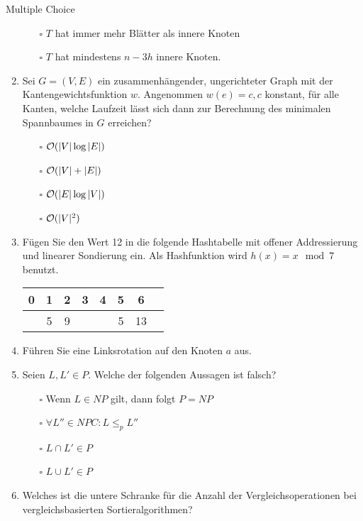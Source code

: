 \documentclass{article}
\begin{document}
\begin{exercise}{Multiple Choice}
\begin{enumerate}
\begin{itemize}
            \item[$\square$] $T$ hat immer mehr Blätter als innere Knoten
            \item[$\square$] $T$ hat mindestens $n - 3h$ innere Knoten.
          \end{itemize}
    \item Sei $G = (V,E)$ ein zusammenhängender, ungerichteter Graph mit der Kantengewichtsfunktion $w$. Angenommen $w(e) = c, c$ konstant, für alle Kanten, welche Laufzeit lässt sich dann zur Berechnung des minimalen Spannbaumes in $G$ erreichen?
          \begin{itemize}
            \item[$\square$] $\mathcal{O}(|V| \log |E|)$
            \item[$\square$] $\mathcal{O}(|V| + |E|)$
            \item[$\square$] $\mathcal{O}(|E| \log |V|)$
            \item[$\square$] $\mathcal{O}(|V|^2)$
          \end{itemize}
    \item Fügen Sie den Wert 12 in die folgende Hashtabelle mit offener Addressierung und linearer Sondierung ein. Als Hashfunktion wird $h(x) = x \mod 7$ benutzt.
          \begin{center}
            \begin{tabular}{|c|c|c|c|c|c|c|c|}
              \hline
              0 & 1 & 2 & 3 & 4 & 5 & 6  \\
              \hline
              \hline
                & 5 & 9 &   &   & 5 & 13 \\
              \hline
            \end{tabular}
          \end{center}
    \item Führen Sie eine Linksrotation auf den Knoten $a$ aus.
    \item Seien $L, L' \in P$. Welche der folgenden Aussagen ist falsch?
          \begin{itemize}
            \item[$\square$] Wenn $L \in NP$ gilt, dann folgt $P = NP$
            \item[$\square$] $\forall L'' \in NPC:L \leq_p L''$
            \item[$\square$] $L \cap L' \in P$
            \item[$\square$] $L \cup L' \in P$
          \end{itemize}
    \item Welches ist die untere Schranke für die Anzahl der Vergleichsoperationen bei vergleichsbasierten Sortieralgorithmen?

\end{enumerate}
\end{exercise}
\end{document}
